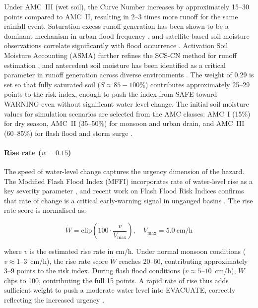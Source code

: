 \documentclass[5p,twocolumn]{elsarticle}
\begin{document}
Under AMC~III (wet soil), the Curve Number increases by approximately 15--30 points compared to AMC~II, resulting in 2--3 times more runoff for the same rainfall event. Saturation-excess runoff generation has been shown to be a dominant mechanism in urban flood frequency \cite{hassini2020}, and satellite-based soil moisture observations correlate significantly with flood occurrence \cite{tangdamrongsub2021}. Activation Soil Moisture Accounting (ASMA) further refines the SCS-CN method for runoff estimation \cite{verma2020}, and antecedent soil moisture has been identified as a critical parameter in runoff generation across diverse environments \cite{assouline2024}. The weight of 0.29 is set so that fully saturated soil ($S \approx 85-100\%$) contributes approximately 25--29 points to the risk index, enough to push the index from SAFE toward WARNING even without significant water level change. The initial soil moisture values for simulation scenarios are selected from the AMC classes: AMC~I (15\%) for dry season, AMC~II (35--50\%) for monsoon and urban drain, and AMC~III (60--85\%) for flash flood and storm surge \cite{usda2004,tangdamrongsub2021}.

\paragraph{Rise rate ($w = 0.15$)} The speed of water-level change captures the urgency dimension of the hazard. The Modified Flash Flood Index (MFFI) incorporates rate of water-level rise as a key severity parameter \cite{kim2014}, and recent work on Flash Flood Risk Indices confirms that rate of change is a critical early-warning signal in ungauged basins \cite{guo2026}. The rise rate score is normalised as:

\begin{equation}
  \dot{W} = \text{clip}\left(100 \cdot \frac{v}{V_{\max}}\right), \quad V_{\max} = 5.0~\text{cm/h}
  \label{eq:rise_norm}
\end{equation}

where $v$ is the estimated rise rate in cm/h. Under normal monsoon conditions ($v \approx 1$--$3$~cm/h), the rise rate score $\dot{W}$ reaches 20--60, contributing approximately 3--9 points to the risk index. During flash flood conditions ($v \approx 5$--$10$~cm/h), $\dot{W}$ clips to 100, contributing the full 15 points. A rapid rate of rise thus adds sufficient weight to push a moderate water level into EVACUATE, correctly reflecting the increased urgency \cite{guo2026}.
\end{document}
